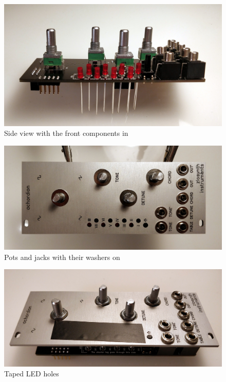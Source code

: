 \documentclass[10pt,a4paper,twocolumn]{article}
\begin{document}
\begin{figure}[h]
  \centering
  \includegraphics[width=\linewidth]{p04.jpg}
  \caption{Side view with the front components in}
  \label{front components}
\end{figure}

\begin{figure}[h]
  \centering
  \includegraphics[width=\linewidth]{p05.jpg}
  \caption{Pots and jacks with their washers on}
  \label{washers}
\end{figure}

\begin{figure}[h]
  \centering
  \includegraphics[width=\linewidth]{p06.jpg}
  \caption{Taped LED holes}
  \label{masking}
\end{figure}
\end{document}
